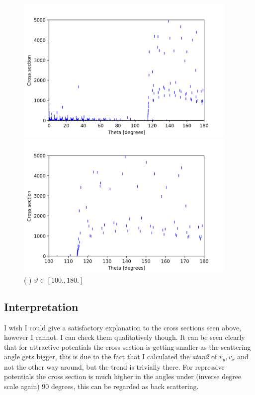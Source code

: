 \documentclass[a4paper,12pt]{article}
\begin{document}
\begin{figure}[H]
	\centering
	\begin{minipage}{0.5\textwidth}
		\centering
		\includegraphics[width=0.95\textwidth]{./cross-pot-co1signed.png}
		\caption{ (-) $\vartheta \in [0., 180.]$ }
	\end{minipage}\hfill
	\begin{minipage}{0.5\textwidth}
		\centering
		\includegraphics[width=0.95\textwidth]{./cross-pot-co2signed.png}
		\caption{ (-) $\vartheta \in [100., 180.]$ }
	\end{minipage}
\end{figure}

\subsection{Interpretation}

\par I wish I could give a satisfactory explanation to
the cross sections seen above, however I cannot. I can
check them qualitatively though. It can be seen clearly that
for attractive potentials the cross section is getting smaller as
the scattering angle gets bigger, this is due to the fact that
I calculated the \textit{atan2} of $v_y, v_x$ and not the other way
around, but the trend is trivially there. For repressive
potentials the cross section is much higher in the angles under
(inverse degree scale again) 90 degrees, this can be regarded as
back scattering.
\end{document}

